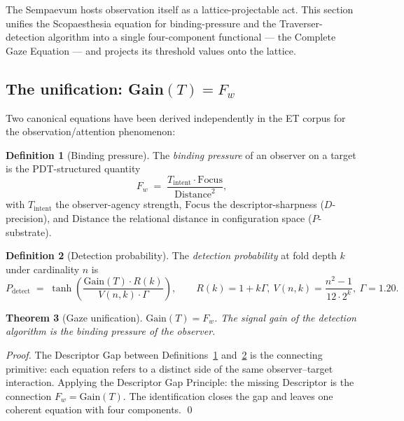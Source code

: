 \documentclass[11pt,a4paper]{article}
\newtheorem{theorem}{Theorem}[section]
\theoremstyle{definition}
\newtheorem{definition}[theorem]{Definition}
\theoremstyle{remark}
\begin{document}
The Sempaevum hosts observation itself as a lattice-projectable act. This section unifies the Scopaesthesia equation for binding-pressure and the Traverser-detection algorithm into a single four-component functional --- the Complete Gaze Equation --- and projects its threshold values onto the lattice.

\subsection{The unification: Gain$(T)=F_{w}$}

Two canonical equations have been derived independently in the ET corpus for the observation/attention phenomenon:

\begin{definition}[Binding pressure]\label{def:binding-pressure}
The \emph{binding pressure} of an observer on a target is the PDT-structured quantity
\[
F_{w} \;=\; \frac{T_{\mathrm{intent}} \cdot \mathrm{Focus}}{\mathrm{Distance}^{2}},
\]
with $T_{\mathrm{intent}}$ the observer-agency strength, $\mathrm{Focus}$ the descriptor-sharpness ($D$-precision), and $\mathrm{Distance}$ the relational distance in configuration space ($P$-substrate).
\end{definition}

\begin{definition}[Detection probability]\label{def:detection-prob}
The \emph{detection probability} at fold depth $k$ under cardinality $n$ is
\[
P_{\mathrm{detect}} \;=\; \tanh\!\left(\frac{\mathrm{Gain}(T)\cdot R(k)}{V(n,k)\cdot \Gamma}\right), \qquad R(k)=1+k\Gamma,\ V(n,k)=\frac{n^{2}-1}{12\cdot 2^{k}},\ \Gamma = 1.20.
\]
\end{definition}

\begin{theorem}[Gaze unification]\label{thm:gaze-unify}
$\mathrm{Gain}(T) = F_{w}$. The signal gain of the detection algorithm is the binding pressure of the observer.
\end{theorem}

\begin{proof}
The Descriptor Gap between Definitions~\ref{def:binding-pressure} and~\ref{def:detection-prob} is the connecting primitive: each equation refers to a distinct side of the same observer--target interaction. Applying the Descriptor Gap Principle: the missing Descriptor is the connection $F_{w}=\mathrm{Gain}(T)$. The identification closes the gap and leaves one coherent equation with four components. \qed
\end{proof}
\end{document}
